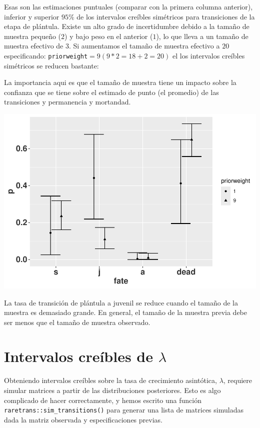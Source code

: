\documentclass[
]{book}
\theoremstyle{definition}
\theoremstyle{definition}
\theoremstyle{definition}
\theoremstyle{definition}
\theoremstyle{remark}
\begin{document}
Esas son las estimaciones puntuales (comparar con la primera columna anterior), inferior
y superior \(95\%\) de los intervalos creíbles simétricos para transiciones de la
etapa de plántula. Existe un alto grado de incertidumbre debido a la
tamaño de muestra pequeño (\(2\)) y bajo peso en el anterior (\(1\)), lo que lleva a
un tamaño de muestra efectivo de 3. Si aumentamos el tamaño de muestra efectivo
a \(20\) especificando: \texttt{priorweight}\(= 9 (9*2 = 18 + 2 = 20)\) el
los intervalos creíbles simétricos se reducen bastante:

La importancia aqui es que el tamaño de muestra tiene un impacto sobre la confianza que se tiene sobre el estimado de punto (el promedio) de las transiciones y permanencia y mortandad.

\includegraphics{Diagnostico_Poblacional_files/figure-latex/chap7_24-1.pdf}

La tasa de transición de plántula a juvenil se reduce cuando el tamaño de la muestra es demasiado grande. En general, el tamaño de la muestra previa debe ser menos que el tamaño de muestra observado.

\section{\texorpdfstring{Intervalos creíbles de \(\lambda\)}{Intervalos creíbles de \textbackslash lambda}}\label{intervalos-creuxedbles-de-lambda}

Obteniendo intervalos creíbles sobre la tasa de crecimiento asintótica, \(\lambda\), requiere simular matrices a partir de las distribuciones posteriores. Esto es algo complicado de hacer correctamente, y hemos escrito una función \texttt{raretrans::sim\_transitions()} para generar una lista de matrices simuladas dada la matriz observada y especificaciones previas.
\end{document}
